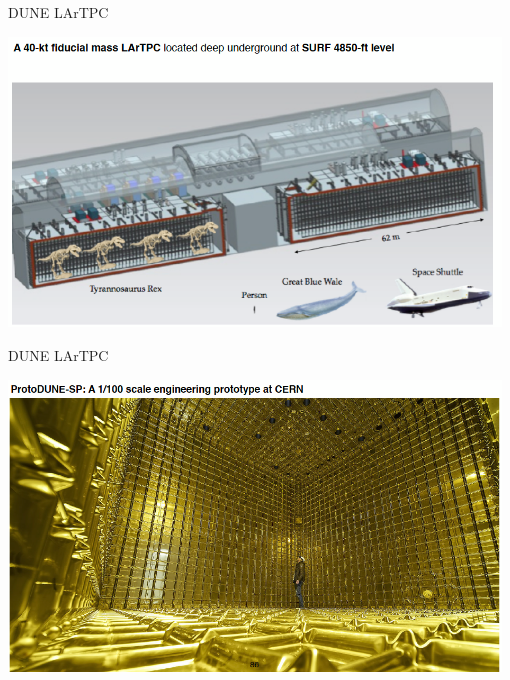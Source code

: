 \begin{frame}{DUNE LArTPC}

\begin{center}
  \includegraphics[width=0.98\textwidth]{./images/3nu/future/lartpc_1}\\
\end{center}

\end{frame}

\begin{frame}{DUNE LArTPC}

\begin{center}
  \includegraphics[width=0.98\textwidth]{./images/3nu/future/lartpc_2}\\
\end{center}

\end{frame}

